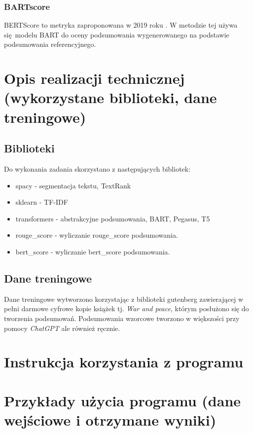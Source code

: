 \documentclass{article}
\begin{document}
\subsubsection{BARTscore}
BERTScore to metryka zaproponowana w 2019 roku \cite{zhang2020bertscoreevaluatingtextgeneration}. 
W metodzie tej używa się modelu BART do oceny podsumowania wygenerowanego na podstawie podsumowania
referencyjnego.

\section{Opis realizacji technicznej (wykorzystane biblioteki, dane treningowe)}
\subsection{Biblioteki}
Do wykonania zadania skorzystano z następujących bibliotek:
\begin{itemize}
	\item spacy - segmentacja tekstu, TextRank
	\item sklearn - TF-IDF
	\item transformers - abstrakcyjne podsumowania, BART, Pegasus, T5
	\item rouge\_score - wyliczanie rouge\_score podsumowania.
	\item bert\_score - wyliczanie bert\_score podsumowania.
\end{itemize}
\subsection{Dane treningowe}
Dane treningowe wytworzono korzystając z biblioteki gutenberg \cite{gutenberg}
zawierającej w pełni darmowe cyfrowe kopie książek tj. \textit{War and peace}, którym
posłużono się do tworzenia podsumowań. Podsumowania wzorcowe tworzono w większości przy pomocy
\textit{ChatGPT} ale również ręcznie.

\section{Instrukcja korzystania z programu}
\section{Przykłady użycia programu (dane wejściowe i otrzymane wyniki)}



\end{document}
